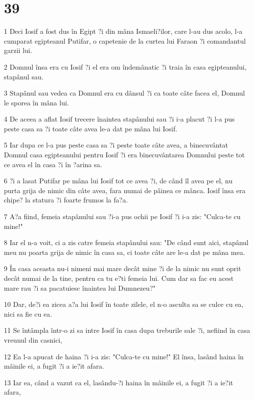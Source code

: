 \chapter{39}

\par 1 Deci Iosif a fost dus în Egipt ?i din mâna Ismaeli?ilor, care l-au dus acolo, l-a cumparat egipteanul Putifar, o capetenie de la curtea lui Faraon ?i comandantul garzii lui.
\par 2 Domnul însa era cu Iosif ?i el era om îndemânatic ?i traia în casa egipteanului, stapânul sau.
\par 3 Stapânul sau vedea ca Domnul era cu dânsul ?i ca toate câte facea el, Domnul le sporea în mâna lui.
\par 4 De aceea a aflat Iosif trecere înaintea stapânului sau ?i i-a placut ?i l-a pus peste casa sa ?i toate câte avea le-a dat pe mâna lui Iosif.
\par 5 Iar dupa ce l-a pus peste casa sa ?i peste toate câte avea, a binecuvântat Domnul casa egipteanului pentru Iosif ?i era binecuvântarea Domnului peste tot ce avea el în casa ?i în ?arina sa.
\par 6 ?i a lasat Putifar pe mâna lui Iosif tot ce avea ?i, de când îl avea pe el, nu purta grija de nimic din câte avea, fara numai de pâinea ce mânca. Iosif însa era chipe? la statura ?i foarte frumos la fa?a.
\par 7 A?a fiind, femeia stapânului sau ?i-a pus ochii pe Iosif ?i i-a zis: "Culca-te cu mine!"
\par 8 Iar el n-a voit, ci a zis catre femeia stapânului sau: "De când sunt aici, stapânul meu nu poarta grija de nimic în casa sa, ci toate câte are le-a dat pe mâna mea.
\par 9 În casa aceasta nu-i nimeni mai mare decât mine ?i de la nimic nu sunt oprit decât numai de la tine, pentru ca tu e?ti femeia lui. Cum dar sa fac eu acest mare rau ?i sa pacatuiesc înaintea lui Dumnezeu?"
\par 10 Dar, de?i ea zicea a?a lui Iosif în toate zilele, el n-o asculta sa se culce cu ea, nici sa fie cu ea.
\par 11 Se întâmpla într-o zi sa intre Iosif în casa dupa treburile sale ?i, nefiind în casa vreunul din casnici,
\par 12 Ea l-a apucat de haina ?i i-a zis: "Culca-te cu mine!" El însa, lasând haina în mâinile ei, a fugit ?i a ie?it afara.
\par 13 Iar ea, când a vazut ca el, lasându-?i haina în mâinile ei, a fugit ?i a ie?it afara,
